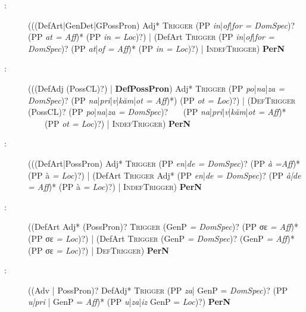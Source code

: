 \documentclass[output=paper]{langsci/langscibook}
\newcommand{\trigger}[1]{\textsc{#1}}
\begin{document}
\begin{description}
\item[:] 

 (((DefArt|GenDet|GPossPron) Adj*
\trigger{Trigger} (PP \textit{in}|\textit{of}|\textit{for = DomSpec})? (PP
\textit{at = Aff})* (PP \textit{in = Loc})?) | (DefArt \trigger{Trigger} (PP \textit{in}|\textit{of}|\textit{for = DomSpec})?
(PP \textit{at}|\textit{of = Aff})* (PP \textit{in = Loc})?) | \trigger{IndefTrigger)}  \textbf{PerN}

 
\item[:] (((DefAdj (PossCL)?) | \textbf{DefPossPron}) Adj* \trigger{Trigger}
(PP \textit{po}|\textit{na}|\textit{za = DomSpec})? (PP \textit{na}|\textit{pri}|\textit{v}|\textit{kăm}|\textit{ot = Aff})*)
(PP \textit{ot = Loc})?) | (\trigger{DefTrigger} (PossCL)? (PP 
\textit{po}|\textit{na}|\textit{za = DomSpec})? ~~~(PP \textit{na}|\textit{pri}|\textit{v}|\textit{kăm}|\textit{ot = Aff})* ~~~~(PP
\textit{ot = Loc})?) | \trigger{IndefTrigger}) \textbf{PerN}


\item[:] (((DefArt|PossPron) Adj* \trigger{Trigger} (PP 
\textit{en}|\textit{de = DomSpec})? (PP
\textit{à =Aff})* (PP à
\textit{= Loc})?) | (DefArt
\trigger{Trigger} Adj* (PP \textit{en}|\textit{de = DomSpec})? (PP
\textit{à|de = Aff})* (PP à \textit{= Loc})?)   |
\trigger{IndefTrigger})  \textbf{PerN}


\item[:] ((DefArt Adj* (PossPron)? \trigger{Trigger} (GenP \textit{= DomSpec})?
(PP σε \textit{= Aff})* (PP σε \textit{= Loc})?) | (DefArt
\trigger{Trigger} (GenP \textit{= DomSpec})? (GenP \textit{= Aff})* (PP
σε \textit{= Loc})?) | \trigger{DefTrigger)}  \textbf{PerN}


\item[:] ((Adv | PossPron)? DefAdj* \trigger{Trigger} (PP \textit{za}| GenP =
\textit{DomSpec})? (PP \textit{u|pri} | GenP = \textit{Aff})* (PP
\textit{u}|\textit{za}|\textit{iz} GenP = \textit{Loc})?)  \textbf{PerN}
\end{description}
\end{document}
